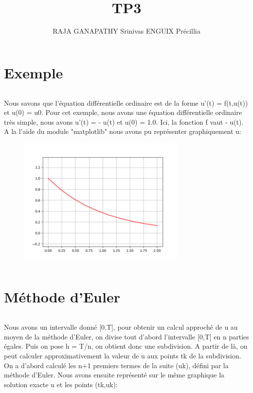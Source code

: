 \documentclass{article}
\title{TP3}
\author{RAJA GANAPATHY Srinivas ENGUIX Précillia}
\begin{document}
\maketitle
        
\section{Exemple}
$$ $$

Nous savons que l'équation différentielle ordinaire est de la forme u'(t) = f(t,u(t)) et u(0) = u0. Pour cet exemple, nous avons une équation différentielle ordinaire très simple, nous avons u'(t) = - u(t) et u(0) = 1.0. Ici, la fonction f vaut - u(t). A la l'aide du module "matplotlib" nous avons pu représenter graphiquement u: 

\begin{figure}
        \centering
        \includegraphics[width=0.75\textwidth]{graph1.png}
       
\end{figure}

$$ $$
$$ $$
$$ $$
$$ $$
$$ $$
$$ $$
$$ $$
$$ $$
$$ $$
$$ $$
$$ $$

\section{Méthode d'Euler}
$$ $$

Nous avons un intervalle donné [0,T], pour obtenir un calcul approché de u au moyen de la méthode d'Euler, on divise tout d'abord l'intervalle [0,T] en n parties égales. Puis on pose h = T/n, on obtient donc une subdivision. A partir de là, on peut calculer approximativement la valeur de u aux points tk de la subdivision. On a d'abord calculé les n+1 premiers termes de la suite (uk), défini par la méthode d'Euler. Nous avons ensuite représenté sur le même graphique la solution exacte u et les points (tk,uk):
\end{document}
